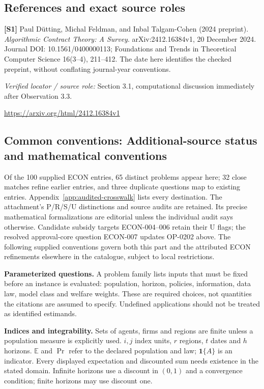 \documentclass[11pt,a4paper]{article}
\begin{document}
\subsection*{References and exact source roles}

{\footnotesize\raggedright
\par\noindent\textbf{[S1]} Paul D\"utting, Michal Feldman, and Inbal Talgam-Cohen (2024 preprint). \emph{Algorithmic Contract Theory: A Survey}. arXiv:2412.16384v1, 20 December 2024. Journal DOI: 10.1561/0400000113; Foundations and Trends in Theoretical Computer Science 16(3--4), 211--412. The date here identifies the checked preprint, without conflating journal-year conventions.\par \textit{Verified locator / source role:} Section 3.1, computational discussion immediately after Observation 3.3.\par \url{https://arxiv.org/html/2412.16384v1}\par\smallskip
}

\subsection*{Common conventions: Additional-source status and mathematical conventions}

\label{audited:conventions}

Of the 100 supplied ECON entries, 65 distinct problems appear here; 32 close
matches refine earlier entries, and three duplicate questions map to existing
entries. Appendix~\ref{app:audited-crosswalk} lists every destination.
The attachment's P/R/S/U distinctions and source audits are retained. Its
precise mathematical formalizations are editorial unless the individual audit
says otherwise. Candidate subsidy targets ECON-004--006 retain their U flags;
the resolved approval-core question ECON-007 updates OP-0202 above.
The following supplied conventions govern both this part and the attributed
ECON refinements elsewhere in the catalogue, subject to local restrictions.

\textbf{Parameterized questions.} A problem family lists inputs that must be fixed before an instance is evaluated: population, horizon, policies, information, data law, model class and welfare weights. These are required choices, not quantities the citations are assumed to specify. Undefined applications should not be treated as identified estimands.

\textbf{Indices and integrability.} Sets of agents, firms and regions are finite unless a population measure is explicitly used. \(i,j\) index units, \(r\) regions, \(t\) dates and \(h\) horizons. \(\mathbb E\) and \(\Pr\) refer to the declared population and law; \(\mathbf1\{A\}\) is an indicator. Every displayed expectation and discounted sum needs existence in the stated domain. Infinite horizons use a discount in \((0,1)\) and a convergence condition; finite horizons may use discount one.
\end{document}
